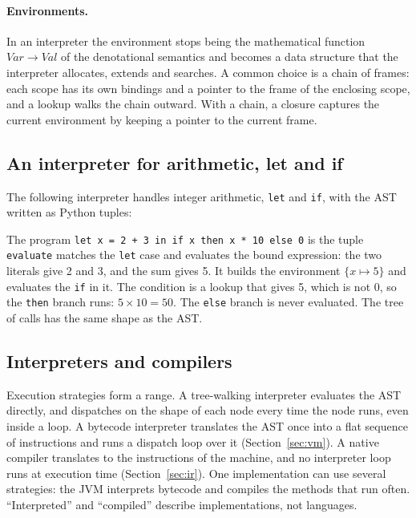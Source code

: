 \paragraph{Environments.} In an interpreter the environment stops being the
mathematical function $\mathit{Var} \to \mathit{Val}$ of the denotational
semantics and becomes a data structure that the interpreter allocates,
extends and searches. A common choice is a chain of frames: each scope has its
own bindings and a pointer to the frame of the enclosing scope, and a lookup
walks the chain outward. With a chain, a closure captures the current
environment by keeping a pointer to the current frame.

\subsection{An interpreter for arithmetic, let and if}

The following interpreter handles integer arithmetic, \texttt{let} and
\texttt{if}, with the AST written as Python tuples:

\begin{example}
The program \texttt{let x = 2 + 3 in if x then x * 10 else 0} is the tuple
\texttt{evaluate} matches the \texttt{let} case and evaluates the bound
expression: the two literals give 2 and 3, and the sum gives 5. It builds the
environment $\{x \mapsto 5\}$ and evaluates the \texttt{if} in it. The
condition is a lookup that gives 5, which is not 0, so the \texttt{then} branch
runs: $5 \times 10 = 50$. The \texttt{else} branch is never evaluated. The tree
of calls has the same shape as the AST.
\end{example}

\subsection{Interpreters and compilers}

Execution strategies form a range. A tree-walking interpreter evaluates the
AST directly, and dispatches on the shape of each node every time the node
runs, even inside a loop. A bytecode interpreter translates the AST once into
a flat sequence of instructions and runs a dispatch loop over it
(Section~\ref{sec:vm}). A native compiler translates to the instructions of
the machine, and no interpreter loop runs at execution time
(Section~\ref{sec:ir}). One implementation can use several strategies: the JVM
interprets bytecode and compiles the methods that run often. ``Interpreted''
and ``compiled'' describe implementations, not languages.

